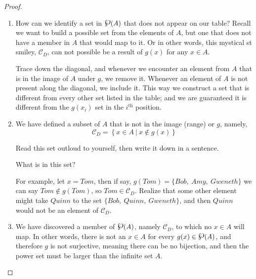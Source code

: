 \begin{proof}
\begin{enumerate}
\item How can we identify a set in $\powerset(A)$ that does not appear on our table?  Recall we want to build a possible set from the elements of $A$, but one that does not have a member in $A$ that would map to it.  Or in other words, this mystical st smiley, $\mathcal{C}_D$, can not possible be a result of $g(x)$ for any $x\in A$.

\ifKey
\hfill\begin{minipage}{0.5\textwidth}\color{red}
Trace down the diagonal, and whenever we encounter an element from $A$ that is in the image of $A$ under $g$, we remove it.  Whenever an element of $A$ is not present along the diagonal, we include it.   This way we construct a set that is different from every other set listed in the table; and we are guaranteed it is different from the $g(x_i)$ set in the $i^{\textrm{th}}$ position.
\color{black}\end{minipage}
\fi 

\item We have defined a subset of $A$ that is not in the image (range) or $g$, namely, 
$$\mathcal{C}_D = \left\{ x\in A~ | ~x\notin  g(x) \right\} $$

Read this set outloud to yourself, then write it down in a sentence.

\newpage
What is in this set? 

\ifKey
\hfill\begin{minipage}{0.5\textwidth}\color{red}For example, let $x = Tom$, then if say, $g(Tom) = \{ Bob, ~Amy, ~Gweneth\} $ we can say $Tom\notin g(Tom)$, so $Tom\in \mathcal{C}_D$.  Realize that some other element might take $Quinn$ to the set $\{ Bob, ~Quinn, ~Gweneth\}$, and then $Quinn$ would not be an element of $\mathcal{C}_D$.
\color{black}\end{minipage}
\fi

\item We have discovered a member of $\powerset(A)$, namely $\mathcal{C}_D$, to which no $x\in A$ will map.  In other words,  there is not an $x\in A$ for every $g(x)\in \powerset(A)$, and therefore $g$ is not surjective, meaning there can be no bijection, and then the power set must be larger than the infinite set $A$.
\end{enumerate}




\end{proof}
